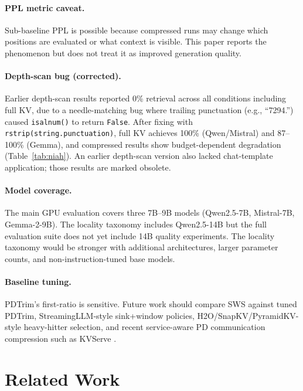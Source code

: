 \documentclass[11pt]{article}
\newcommand{\method}{SWS}
\newcommand{\pct}{\%}
\theoremstyle{definition}
\theoremstyle{plain}
\begin{document}
\paragraph{PPL metric caveat.}
Sub-baseline PPL is possible because compressed runs may change which positions are evaluated or what context is visible.  This paper reports the phenomenon but does not treat it as improved generation quality.

\paragraph{Depth-scan bug (corrected).}
Earlier depth-scan results reported 0\pct{} retrieval across all conditions including full KV, due to a needle-matching bug where trailing punctuation (e.g., ``7294.'') caused \texttt{isalnum()} to return \texttt{False}.  After fixing with \texttt{rstrip(string.punctuation)}, full KV achieves 100\pct{} (Qwen/Mistral) and 87--100\pct{} (Gemma), and compressed results show budget-dependent degradation (Table~\ref{tab:niah}).  An earlier depth-scan version also lacked chat-template application; those results are marked obsolete.

\paragraph{Model coverage.}
The main GPU evaluation covers three 7B--9B models (Qwen2.5-7B, Mistral-7B, Gemma-2-9B).  The locality taxonomy includes Qwen2.5-14B but the full evaluation suite does not yet include 14B quality experiments.  The locality taxonomy would be stronger with additional architectures, larger parameter counts, and non-instruction-tuned base models.

\paragraph{Baseline tuning.}
PDTrim's first-ratio is sensitive.  Future work should compare \method{} against tuned PDTrim, StreamingLLM-style sink+window policies, H2O/SnapKV/PyramidKV-style heavy-hitter selection, and recent service-aware PD communication compression such as KVServe \citep{kvserve}.

\section{Related Work}
\label{sec:related}
\end{document}

